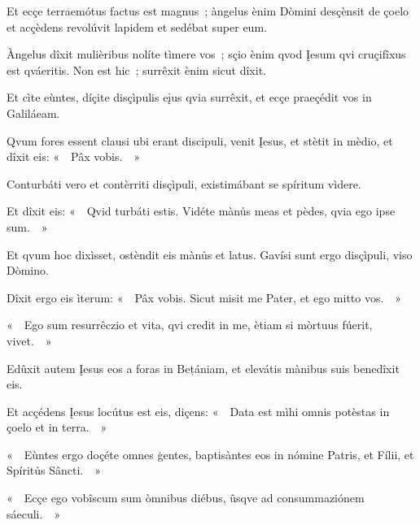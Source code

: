 Et ecçe terraemótus factus est magnus~; àngelus ènim Dòmini desçènsit de çoelo et acçèdens revolúvit lapidem et sedébat super eum. 

Àngelus dîxit mulièribus nolíte tìmere vos~; sçio ènim qvod Įesum qvi cruçifîxus est qváeritis. Non est hic~; surrêxit ènim sicut dîxit. 

Et cìte eùntes, díçite disçìpulis eįus qvia surrêxit, et ecçe praeçédit vos in Galiláeam. 

Qvum fores essent clausi ubi erant discipuli, venit Įesus, et stètit in mèdio, et dîxit eis: «~~Pâx vobis.~~» 

Conturbáti vero et contèrriti disçìpuli, existimábant se spíritum vìdere. 

Et dîxit eis: «~~Qvid turbáti estis. Vidéte mànůs meas et pèdes, qvia ego ipse sum.~~» 

Et qvum hoc dixìsset, ostèndit eis mànůs et latus. Gavísi sunt ergo disçìpuli, viso Dòmino. 

Dîxit ergo eis ìterum: «~~Pâx vobis. Sicut misit me Pater, et ego mitto vos.~~» 

«~~Ego sum resurrêczio et vita, qvi credit in me, ètiam si mòrtuus fúerit, vivet.~~» 


Edûxit autem Įesus eos a foras in Bețániam, et elevátis mànibus suis benedîxit eis. 

Et acçédens Įesus locútus est eis, diçens: «~~Data est mìhi omnis potèstas in çoelo et in terra.~~» 

«~~Eùntes ergo doçéte omnes ģentes, baptisàntes eos in nómine Patris, et Fílii, et Spíritůs Sâncti.~~» 

«~~Ecçe ego vobîscum sum òmnibus diébus, ûsqve ad consummaziónem sáeculi.~~» 

